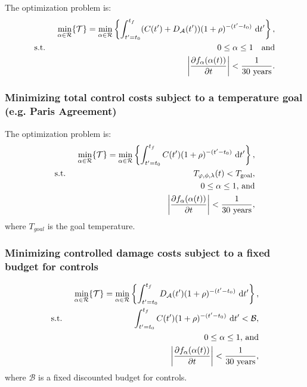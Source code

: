 \documentclass{article}
\begin{document}
The optimization problem is:
\begin{align}
    && \min_{\alpha \in \mathcal{R}} \{ \mathcal{T} \} = \min_{\alpha \in \mathcal{R}} \left\{
    \int_{t'=t_{0}}^{t_{f}}
    (C(t') + D_{\mathcal{A}}(t')) (1 + \rho)^{-(t'-t_{0})} \text{ d}t' \right\},
    \\
    & \text{s.t. }
    & 0 \leq \alpha \leq 1\quad \text{and}\\
    && \abs{\pdv{f_{\alpha}(\alpha(t))}{t}} < \frac{1}{30\text{ years}}.
\end{align}

\subsubsection{Minimizing total control costs subject to a temperature goal (e.g. Paris Agreement)}

The optimization problem is:
\begin{align}
    & & \min_{\alpha \in \mathcal{R}} \{ \mathcal{T} \} = \min_{\alpha \in \mathcal{R}} \left\{
    \int_{t'=t_{0}}^{t_{f}}
    C(t') (1 + \rho)^{-(t'-t_{0})} \text{ d}t' \right\},
    \\
    & \text{s.t. }
    & T_{\varphi, \phi, \lambda}(t) < T_{\text{goal}},\\
    && 0 \leq \alpha \leq 1\text{, and}\\
    &&\abs{\pdv{f_{\alpha}(\alpha(t))}{t}} < \frac{1}{30\text{ years}},
\end{align}
where $T_{goal}$ is the goal temperature.

\subsubsection{Minimizing controlled damage costs subject to a fixed budget for controls}

\begin{align}
    & & \min_{\alpha \in \mathcal{R}} \{ \mathcal{T} \} = \min_{\alpha \in \mathcal{R}} \left\{
    \int_{t'=t_{0}}^{t_{f}}
    D_{\mathcal{A}}(t') (1 + \rho)^{-(t'-t_{0})} \text{ d}t' \right\},\\
    & \text{s.t. }
    & \int_{t'=t_{0}}^{t_{f}}
    C(t') (1 + \rho)^{-(t'-t_{0})} \text{ d}t' < \mathcal{B},\\
    &&0 \leq \alpha \leq 1\text{, and}\\
    &&\abs{\pdv{f_{\alpha}(\alpha(t))}{t}} < \frac{1}{30\text{ years}},
\end{align}
where $\mathcal{B}$ is a fixed discounted budget for controls.

%
%
\end{document}
